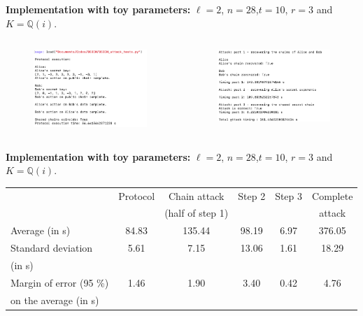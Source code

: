 \documentclass[10pt]{beamer}
\theoremstyle{plain}
\theoremstyle{definition}
\newcommand{\Q}{\mathbb{Q}}
\renewcommand{\(}{\left(}
\renewcommand{\)}{\right)}
\begin{document}
\begin{frame}
\textbf{Implementation with toy parameters:} $\ell=2$, $n=28$,$t=10$, $r=3$ and $K=\Q(i)$.

\begin{columns}[t]
\begin{figure}
\includegraphics[width=5.5cm]
{Protocol_execution.png} 
\end{figure}



\begin{figure}
\includegraphics[width=5.5cm]
{Attack_execution.png} 

\end{figure}
\end{columns}

\end{frame}

\begin{frame}
\textbf{Implementation with toy parameters:} $\ell=2$, $n=28$,$t=10$, $r=3$ and $K=\Q(i)$.

\begin{center}
\begin{footnotesize}
\begin{tabular}{l|c|c|c|c|c}
 & Protocol & Chain attack & Step 2 & Step 3 & Complete\\
 & & (half of step 1) & & & attack \\
 \hline
 Average (in s) & 84.83 & 135.44 & 98.19 & 6.97 & 376.05 \\
 Standard deviation & 5.61 & 7.15 & 13.06 & 1.61 & 18.29 \\
 (in s) & & & & & \\
Margin of error (95 \%)  & 1.46  & 1.90  & 3.40   & 0.42  & 4.76  \\
on the average (in s) & &  &  &  &  \\
\end{tabular}
\end{footnotesize}
\end{center}

\end{frame}
\end{document}
